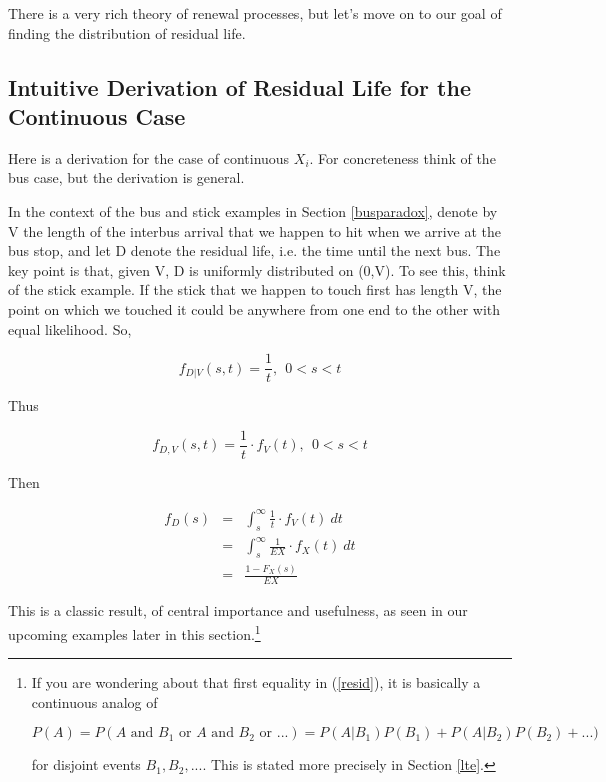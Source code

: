 There is a very rich theory of renewal processes, but let's move on to
our goal of finding the distribution of residual life.

\subsection{Intuitive Derivation of Residual Life for the Continuous
Case}
\label{deriveresidlife}

Here is a derivation for the case of continuous $X_i$.  For
concreteness think of the bus case, but the derivation is general.

In the context of the bus and stick examples in Section
\ref{busparadox}, denote by V the length of the interbus arrival that we
happen to hit when we arrive at the bus stop, and let D denote the
residual life, i.e. the time until the next bus.  The key point is that,
given V, D is uniformly distributed on (0,V).  To see this, think of the
stick example.  If the stick that we happen to touch first has length V,
the point on which we touched it could be anywhere from one end to the
other with equal likelihood.  So,

\begin{equation}
f_{D|V}(s,t) = \frac{1}{t}, ~~ 0 < s < t
\end{equation}

Thus

\begin{equation}
f_{D,V}(s,t) = \frac{1}{t} \cdot f_V(t), ~~ 0 < s < t
\end{equation}

Then 

\begin{eqnarray}
\label{resid}
f_{D}(s) &=& \int_{s}^{\infty} \frac{1}{t} \cdot f_V(t) ~ dt \\
&=& \int_{s}^{\infty} \frac{1}{EX} \cdot f_X(t) ~ dt \\
&=& \frac{1-F_X(s)}{EX}
\end{eqnarray}

This is a classic result, of central importance and usefulness, as seen
in our upcoming examples later in this section.\footnote{If you are
wondering about that first equality in (\ref{resid}), it is basically a
continuous analog of 

$$
P(A) = P(A \textrm{ and } B_1 \textrm{ or } A \textrm{ and } B_2
\textrm{ or } ...) =
P(A | B_1) P(B_1) + P(A|B_2) P(B_2) + ...)
$$

for disjoint events $B_1, B_2, ...$.  This is stated more precisely in
Section \ref{lte}.}

